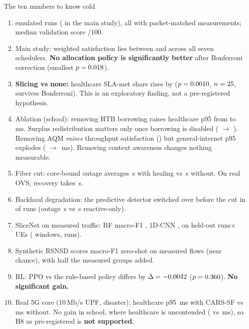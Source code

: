 \documentclass[10pt,a4paper]{article}
\begin{document}
\begin{keybox}{The ten numbers to know cold}
\begin{enumerate}[leftmargin=1.4em]
\item \NRuns{} emulated runs (\NRunsMain{} in the main study), all with packet-matched measurements; median validation score \NValidationMedian/100.
\item Main study: weighted satisfaction lies between \NUtilMin{} and \NUtilMax{} across all seven schedulers.
  \textbf{No allocation policy is significantly better} after Bonferroni correction (smallest $p=0.018$).
\item \textbf{Slicing vs none:} healthcare SLA-met share rises by \NSlaDeltaNoSlicing{} ($p=0.0010$, $n=25$, survives Bonferroni). This is an exploratory finding, not a pre-registered hypothesis.
\item Ablation (school): removing HTB borrowing raises healthcare p95 from \NAblSchoolFullHc{} to \NAblSchoolFullStrictHc{}\,ms.
  Surplus redistribution matters only once borrowing is disabled (\NAblSchoolFullStrictUtil{} $\rightarrow$ \NAblSchoolNoSurplusStrictUtil).
  Removing AQM \emph{raises} throughput satisfaction (\NAblSchoolNoAqmUtil) but general-internet p95 explodes (\NAblSchoolFullGenP{} $\rightarrow$ \NAblSchoolNoAqmGenP\,ms). Removing context awareness changes nothing measurable.
\item Fiber cut: core-bound outage averages \NOutCutFullMean\,s with healing vs \NOutCutNoneMean\,s without. On real OVS, recovery takes \NOvsMttrAfter\,s.
\item Backhaul degradation: the predictive detector switched over before the cut in \NDegBeforeCutShare{} of runs (outage \NOutDegFullMean\,s vs \NOutDegReactiveMean\,s reactive-only).
\item SliceNet on measured traffic: RF macro-F1 \NSnRfFone, 1D-CNN \NSnCnnFone, on held-out runs$\times$UEs (\NSnRows{} windows, \NSnRunsCount{} runs).
\item Synthetic RSNSD scores macro-F1 \NTrZero{} zero-shot on measured flows (near chance), \NTrHalf{} with half the measured groups added.
\item RL: PPO vs the rule-based policy differs by $\Delta=-0.0042$ ($p=0.360$). \textbf{No significant gain.}
\item Real 5G core (10\,Mb/s UPF, disaster): healthcare p95 \NFgDisasterCarsHcP\,ms with CARS-SF vs \NFgDisasterNoneHcP\,ms without. No gain in school, where healthcare is uncontended (\NFgSchoolCarsHcP{} vs \NFgSchoolNoneHcP\,ms), so H8 as pre-registered is \textbf{not supported}.
\end{enumerate}
\end{keybox}
\end{document}
